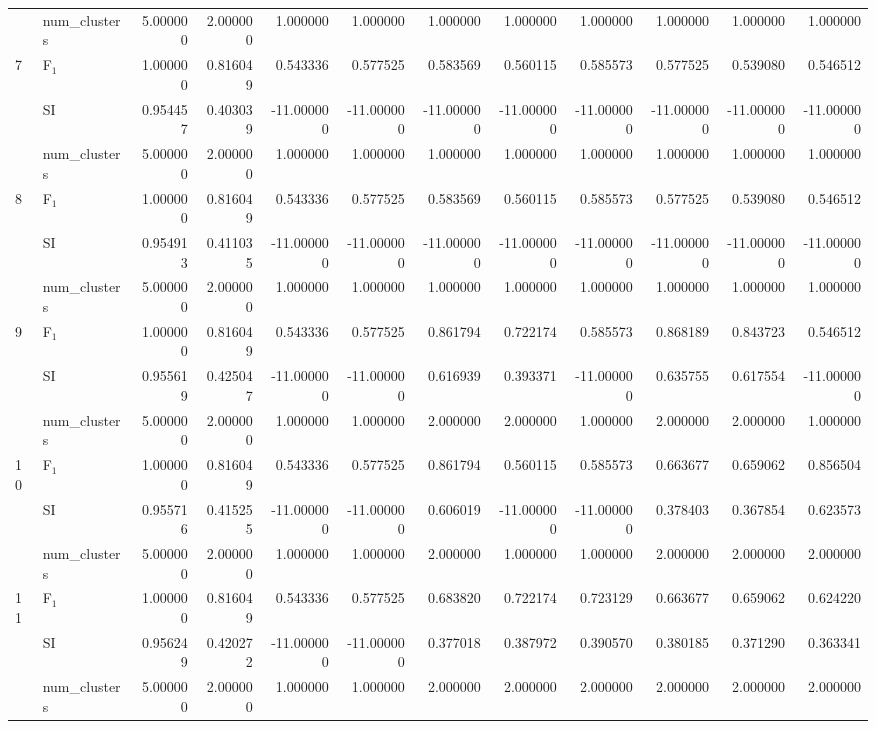 \begin{tabular}{llrrrrrrrrrr}
 & num_clusters & 5.000000 & 2.000000 & 1.000000 & 1.000000 & 1.000000 & 1.000000 & 1.000000 & 1.000000 & 1.000000 & 1.000000 \\
\multirow[c]{3}{*}{7} & F$_1$ & 1.000000 & 0.816049 & 0.543336 & 0.577525 & 0.583569 & 0.560115 & 0.585573 & 0.577525 & 0.539080 & 0.546512 \\
 & SI & 0.954457 & 0.403039 & -11.000000 & -11.000000 & -11.000000 & -11.000000 & -11.000000 & -11.000000 & -11.000000 & -11.000000 \\
 & num_clusters & 5.000000 & 2.000000 & 1.000000 & 1.000000 & 1.000000 & 1.000000 & 1.000000 & 1.000000 & 1.000000 & 1.000000 \\
\multirow[c]{3}{*}{8} & F$_1$ & 1.000000 & 0.816049 & 0.543336 & 0.577525 & 0.583569 & 0.560115 & 0.585573 & 0.577525 & 0.539080 & 0.546512 \\
 & SI & 0.954913 & 0.411035 & -11.000000 & -11.000000 & -11.000000 & -11.000000 & -11.000000 & -11.000000 & -11.000000 & -11.000000 \\
 & num_clusters & 5.000000 & 2.000000 & 1.000000 & 1.000000 & 1.000000 & 1.000000 & 1.000000 & 1.000000 & 1.000000 & 1.000000 \\
\multirow[c]{3}{*}{9} & F$_1$ & 1.000000 & 0.816049 & 0.543336 & 0.577525 & 0.861794 & 0.722174 & 0.585573 & 0.868189 & 0.843723 & 0.546512 \\
 & SI & 0.955619 & 0.425047 & -11.000000 & -11.000000 & 0.616939 & 0.393371 & -11.000000 & 0.635755 & 0.617554 & -11.000000 \\
 & num_clusters & 5.000000 & 2.000000 & 1.000000 & 1.000000 & 2.000000 & 2.000000 & 1.000000 & 2.000000 & 2.000000 & 1.000000 \\
\multirow[c]{3}{*}{10} & F$_1$ & 1.000000 & 0.816049 & 0.543336 & 0.577525 & 0.861794 & 0.560115 & 0.585573 & 0.663677 & 0.659062 & 0.856504 \\
 & SI & 0.955716 & 0.415255 & -11.000000 & -11.000000 & 0.606019 & -11.000000 & -11.000000 & 0.378403 & 0.367854 & 0.623573 \\
 & num_clusters & 5.000000 & 2.000000 & 1.000000 & 1.000000 & 2.000000 & 1.000000 & 1.000000 & 2.000000 & 2.000000 & 2.000000 \\
\multirow[c]{3}{*}{11} & F$_1$ & 1.000000 & 0.816049 & 0.543336 & 0.577525 & 0.683820 & 0.722174 & 0.723129 & 0.663677 & 0.659062 & 0.624220 \\
 & SI & 0.956249 & 0.420272 & -11.000000 & -11.000000 & 0.377018 & 0.387972 & 0.390570 & 0.380185 & 0.371290 & 0.363341 \\
 & num_clusters & 5.000000 & 2.000000 & 1.000000 & 1.000000 & 2.000000 & 2.000000 & 2.000000 & 2.000000 & 2.000000 & 2.000000 \\
\bottomrule
\end{tabular}
